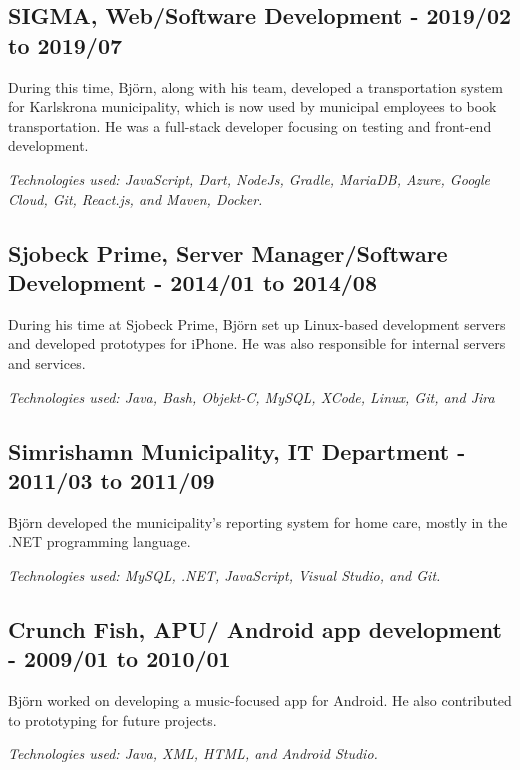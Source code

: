 \begin{minipage}[t]{0.7\textwidth}
\vspace{15pt} %
\subsection*{\textcolor{colorTitelErfarenhet}{SIGMA, Web/Software Development - 2019/02 to 2019/07}}
During this time, Björn, along with his team, developed a transportation system for Karlskrona municipality, which is now used by municipal employees to book transportation. He was a full-stack developer focusing on testing and front-end development.

\vspace{5pt}\textit{Technologies used: JavaScript, Dart, NodeJs, Gradle, MariaDB, Azure, Google Cloud, Git, React.js, and Maven, Docker.} 

\subsection*{\textcolor{colorTitelErfarenhet}{Sjobeck Prime, Server Manager/Software Development - 2014/01 to 2014/08}}
During his time at Sjobeck Prime, Björn set up Linux-based development servers and developed prototypes for iPhone. He was also responsible for internal servers and services.

\vspace{5pt}\textit{Technologies used: Java, Bash, Objekt-C, MySQL, XCode, Linux, Git, and Jira} 

\vspace{15pt} %
\subsection*{\textcolor{colorTitelErfarenhet}{Simrishamn Municipality, IT Department - 2011/03 to 2011/09}}
Björn developed the municipality's reporting system for home care, mostly in the .NET programming language.

\vspace{5pt}\textit{Technologies used: MySQL, .NET, JavaScript, Visual Studio, and Git.}


\vspace{15pt} %
\subsection*{\textcolor{colorTitelErfarenhet}{Crunch Fish, APU/ Android app development - 2009/01 to 2010/01}}
Björn worked on developing a music-focused app for Android. He also contributed to prototyping for future projects.

\vspace{5pt}\textit{Technologies used: Java, XML, HTML, and Android Studio.}
\end{minipage}%